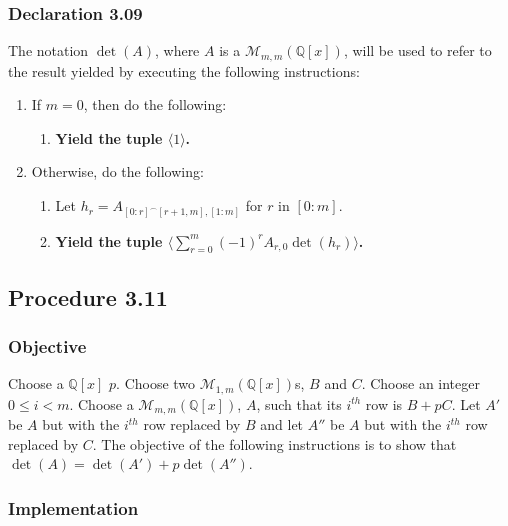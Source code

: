 \documentclass[twocolumn]{article}
\newcommand{\declaration}[1]{\subsubsection*{Declaration #1}\label{sec:declaration #1}}
\newcommand{\procedure}[2][]{\subsection*{Procedure #2 \ifthenelse{\equal{#1}{}}{}{(#1)}}\label{sec:procedure #2}}
\newcommand{\objective}{\subsubsection*{Objective}}
\newcommand{\implementation}{\subsubsection*{Implementation}}
\begin{document}
		\declaration{3.09}
			The notation $\det(A)$, where $A$ is a $\mathcal{M}_{m,m}(\mathbb{Q}[x])$, will be used to refer to the result yielded by executing the following instructions:
			\begin{enumerate}
				\item If $m=0$, then do the following:
				\begin{enumerate}
					\item \textbf{Yield the tuple $\langle 1\rangle$.}
				\end{enumerate}
				\item Otherwise, do the following:
				\begin{enumerate}
					\item Let $h_r=A_{[0:r]^\frown[r+1,m],[1:m]}$ for $r$ in $[0:m]$.
					\item \textbf{Yield the tuple $\langle\sum_{r=0}^m (-1)^{r}A_{r,0}\det(h_r)\rangle$.}
				\end{enumerate}
			\end{enumerate}
		\procedure{3.11}
			\objective
				Choose a $\mathbb{Q}[x]$ $p$. Choose two $\mathcal{M}_{1,m}(\mathbb{Q}[x])$s, $B$ and $C$. Choose an integer $0\le i<m$. Choose a $\mathcal{M}_{m,m}(\mathbb{Q}[x])$, $A$, such that its $i^{th}$ row is $B+pC$. Let $A'$ be $A$ but with the $i^{th}$ row replaced by $B$ and let $A''$ be $A$ but with the $i^{th}$ row replaced by $C$. The objective of the following instructions is to show that $\det(A)=\det(A')+p\det(A'')$.
			\implementation
\end{document}
